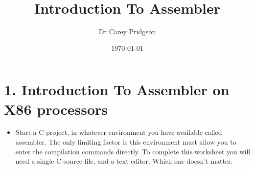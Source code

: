 \documentclass[minimal, t]{article}
\author{Dr Carey Pridgeon}
\date{\today}
\title{Introduction To Assembler}
\begin{document}
\maketitle
\section{1.         Introduction To Assembler on X86 processors}
\label{sec-1}

\begin{itemize}
\item Start a C project, in whatever environment you have available called
assembler. The only limiting factor is this environment must allow you to
enter the compilation commands directly. To complete this worksheet you will
need a single C source file, and a text editor. Which one doesn’t matter.
\end{itemize}
\end{document}
